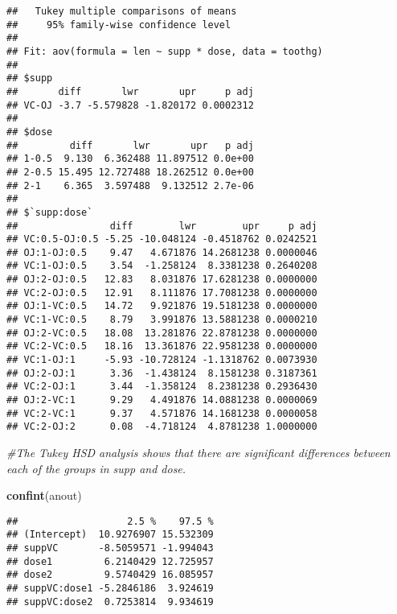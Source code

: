 \documentclass[
]{article}
\newenvironment{Shaded}{\begin{snugshade}}{\end{snugshade}}
\newcommand{\CommentTok}[1]{\textcolor[rgb]{0.56,0.35,0.01}{\textit{#1}}}
\newcommand{\KeywordTok}[1]{\textcolor[rgb]{0.13,0.29,0.53}{\textbf{#1}}}
\newcommand{\NormalTok}[1]{#1}
\begin{document}
\begin{verbatim}
##   Tukey multiple comparisons of means
##     95% family-wise confidence level
## 
## Fit: aov(formula = len ~ supp * dose, data = toothg)
## 
## $supp
##       diff       lwr       upr     p adj
## VC-OJ -3.7 -5.579828 -1.820172 0.0002312
## 
## $dose
##         diff       lwr       upr   p adj
## 1-0.5  9.130  6.362488 11.897512 0.0e+00
## 2-0.5 15.495 12.727488 18.262512 0.0e+00
## 2-1    6.365  3.597488  9.132512 2.7e-06
## 
## $`supp:dose`
##                diff        lwr        upr     p adj
## VC:0.5-OJ:0.5 -5.25 -10.048124 -0.4518762 0.0242521
## OJ:1-OJ:0.5    9.47   4.671876 14.2681238 0.0000046
## VC:1-OJ:0.5    3.54  -1.258124  8.3381238 0.2640208
## OJ:2-OJ:0.5   12.83   8.031876 17.6281238 0.0000000
## VC:2-OJ:0.5   12.91   8.111876 17.7081238 0.0000000
## OJ:1-VC:0.5   14.72   9.921876 19.5181238 0.0000000
## VC:1-VC:0.5    8.79   3.991876 13.5881238 0.0000210
## OJ:2-VC:0.5   18.08  13.281876 22.8781238 0.0000000
## VC:2-VC:0.5   18.16  13.361876 22.9581238 0.0000000
## VC:1-OJ:1     -5.93 -10.728124 -1.1318762 0.0073930
## OJ:2-OJ:1      3.36  -1.438124  8.1581238 0.3187361
## VC:2-OJ:1      3.44  -1.358124  8.2381238 0.2936430
## OJ:2-VC:1      9.29   4.491876 14.0881238 0.0000069
## VC:2-VC:1      9.37   4.571876 14.1681238 0.0000058
## VC:2-OJ:2      0.08  -4.718124  4.8781238 1.0000000
\end{verbatim}

\begin{Shaded}
\begin{Highlighting}[]
\CommentTok{#The Tukey HSD  analysis shows that there are significant differences between each of the groups in supp and dose.}
\end{Highlighting}
\end{Shaded}

\begin{Shaded}
\begin{Highlighting}[]
\KeywordTok{confint}\NormalTok{(anout)}
\end{Highlighting}
\end{Shaded}

\begin{verbatim}
##                   2.5 %    97.5 %
## (Intercept)  10.9276907 15.532309
## suppVC       -8.5059571 -1.994043
## dose1         6.2140429 12.725957
## dose2         9.5740429 16.085957
## suppVC:dose1 -5.2846186  3.924619
## suppVC:dose2  0.7253814  9.934619
\end{verbatim}
\end{document}
